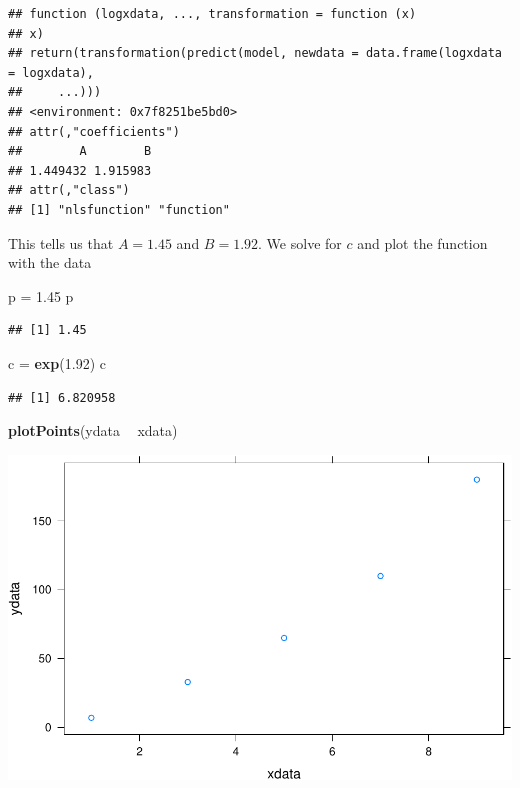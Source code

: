 \documentclass[
]{book}
\newenvironment{Shaded}{\begin{snugshade}}{\end{snugshade}}
\newcommand{\FloatTok}[1]{\textcolor[rgb]{0.00,0.00,0.81}{#1}}
\newcommand{\KeywordTok}[1]{\textcolor[rgb]{0.13,0.29,0.53}{\textbf{#1}}}
\newcommand{\NormalTok}[1]{#1}
\newcommand{\OperatorTok}[1]{\textcolor[rgb]{0.81,0.36,0.00}{\textbf{#1}}}
\newcommand{\StringTok}[1]{\textcolor[rgb]{0.31,0.60,0.02}{#1}}
\begin{document}
\begin{verbatim}
## function (logxdata, ..., transformation = function (x) 
## x) 
## return(transformation(predict(model, newdata = data.frame(logxdata = logxdata), 
##     ...)))
## <environment: 0x7f8251be5bd0>
## attr(,"coefficients")
##        A        B 
## 1.449432 1.915983 
## attr(,"class")
## [1] "nlsfunction" "function"
\end{verbatim}

This tells us that \(A=1.45\) and \(B=1.92\). We solve for \(c\) and plot the function with the data

\begin{Shaded}
\begin{Highlighting}[]
\NormalTok{p =}\StringTok{ }\FloatTok{1.45}
\NormalTok{p}
\end{Highlighting}
\end{Shaded}

\begin{verbatim}
## [1] 1.45
\end{verbatim}

\begin{Shaded}
\begin{Highlighting}[]
\NormalTok{c =}\StringTok{ }\KeywordTok{exp}\NormalTok{(}\FloatTok{1.92}\NormalTok{)}
\NormalTok{c}
\end{Highlighting}
\end{Shaded}

\begin{verbatim}
## [1] 6.820958
\end{verbatim}

\begin{Shaded}
\begin{Highlighting}[]
\KeywordTok{plotPoints}\NormalTok{(ydata }\OperatorTok{~}\StringTok{ }\NormalTok{xdata)}
\end{Highlighting}
\end{Shaded}

\includegraphics{_bookdown_files/math135_handbook_files/figure-latex/unnamed-chunk-38-1.pdf}
\end{document}
